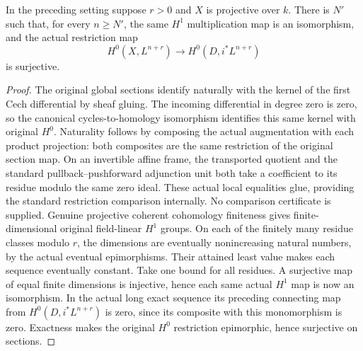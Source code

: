 \begin{lemma}
\label{lem:seshadri-single-cut-hone-stable-restriction-surjective}
In the preceding setting suppose $r>0$ and $X$ is projective over $k$. There is
$N'$ such that, for every $n\geq N'$, the same $H^1$ multiplication map
is an isomorphism, and the actual restriction map
\[
H^0(X,L^{n+r})\longrightarrow H^0(D,i^*L^{n+r})
\]
is surjective.
\end{lemma}
\begin{proof}
The original global sections identify naturally with the kernel of the first
Cech differential by sheaf gluing. The incoming differential in degree zero
is zero, so the canonical cycles-to-homology isomorphism identifies this
same kernel with original $H^0$. Naturality follows by composing the actual
augmentation with each product projection: both composites are the same
restriction of the original section map. On an invertible affine frame,
the transported quotient and the standard pullback--pushforward adjunction
unit both take a coefficient to its residue modulo the same zero ideal.
These actual local equalities glue, providing the standard restriction
comparison internally. No comparison certificate is supplied.
Genuine projective coherent cohomology finiteness gives finite-dimensional
original field-linear $H^1$ groups. On each of the finitely many residue
classes modulo $r$, the dimensions are eventually nonincreasing natural
numbers, by the actual eventual epimorphisms. Their attained least value
makes each sequence eventually constant. Take one bound for all residues.
A surjective map of equal finite dimensions is injective, hence each
same actual $H^1$ map is now an isomorphism. In the actual long exact
sequence its preceding connecting map from $H^0(D,i^*L^{n+r})$ is zero,
since its composite with this monomorphism is zero. Exactness makes
the original $H^0$ restriction epimorphic, hence surjective on sections.
\end{proof}
